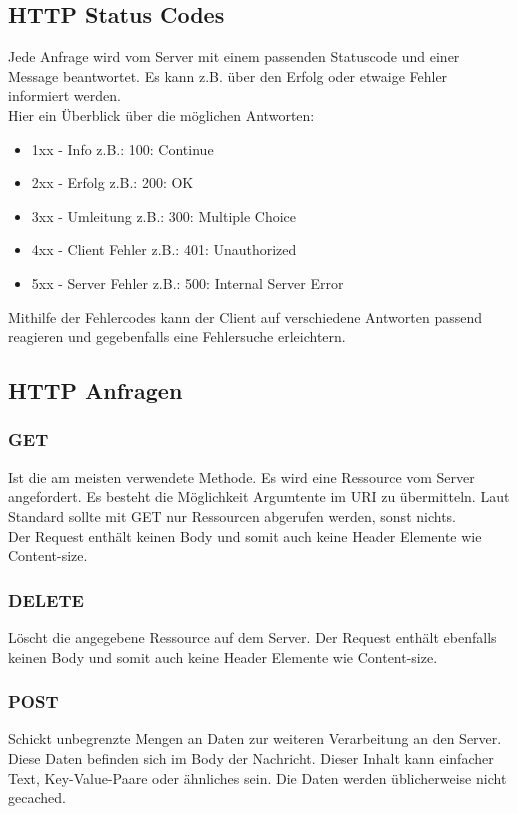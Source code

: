 \documentclass{article}
\begin{document}
\subsection{HTTP Status Codes}
Jede Anfrage wird vom Server mit einem passenden Statuscode und einer Message beantwortet. Es kann z.B. über den Erfolg oder etwaige Fehler informiert werden. \\
Hier ein Überblick über die möglichen Antworten:
\begin{itemize}
    \item 1xx - Info z.B.: 100: Continue
    \item 2xx - Erfolg z.B.: 200: OK
    \item 3xx - Umleitung z.B.: 300: Multiple Choice
    \item 4xx - Client Fehler z.B.: 401: Unauthorized
    \item 5xx - Server Fehler z.B.: 500: Internal Server Error
\end{itemize}

Mithilfe der Fehlercodes kann der Client auf verschiedene Antworten passend reagieren und gegebenfalls eine Fehlersuche erleichtern. 

\subsection{HTTP Anfragen}
\subsubsection{GET}
Ist die am meisten verwendete Methode. Es wird eine Ressource vom Server angefordert. Es besteht die Möglichkeit Argumtente im URI zu übermitteln. Laut Standard sollte mit GET nur Ressourcen abgerufen werden, sonst nichts. \\
Der Request enthält keinen Body und somit auch keine Header Elemente wie Content-size.

\subsubsection{DELETE}
Löscht die angegebene Ressource auf dem Server. Der Request enthält ebenfalls keinen Body und somit auch keine Header Elemente wie Content-size. 

\subsubsection{POST}
Schickt unbegrenzte Mengen an Daten zur weiteren Verarbeitung an den Server. Diese Daten befinden sich im Body der Nachricht. Dieser Inhalt kann einfacher Text, Key-Value-Paare oder ähnliches sein. Die Daten werden üblicherweise nicht gecached. 
\end{document}
